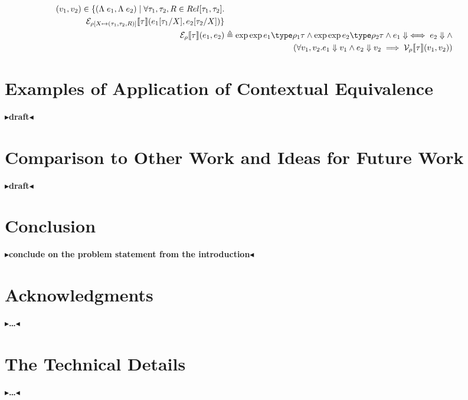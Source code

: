 \documentclass[twoside,11pt,openright]{report}
\theoremstyle{definition}
\newcommand{\expr}{e}
\newcommand{\val}{v}
\newcommand{\Tvar}{X}
\newcommand{\Tlam}{\Lambda\;}
\newcommand{\subst}[3]{#1{\left[#3 \middle/ #2 \right]}}
\newcommand{\typ}{\tau}
\newcommand{\empvenv}{\bullet}
\newcommand{\emptenv}{\bullet}
\def\envs#1#2\exp#3\type#4{#1 \; | \; #2 \; \vdash #3 : #4}
\newcommand{\ValInp}[2]{\mathcal{V}_{#1} \llbracket #2 \rrbracket}
\newcommand{\ValInpGen}[2]{\ValInp{#1}{#2}(\val_1, \val_2)}
\newcommand{\ExpInp}[2]{\mathcal{E}_{#1} \llbracket #2 \rrbracket}
\newcommand{\map}[2]{#1 \mapsto #2}
\newcommand{\todo}[1]{{\color[rgb]{.5,0,0}\textbf{$\blacktriangleright$#1$\blacktriangleleft$}}}
\begin{document}
\begin{align*}
\begin{aligned}[t]
    (\val_1, \val_2) \in \{(\Tlam \expr_1, \Tlam \expr_2) \mid \forall \typ_1, \typ_2, R \in Rel[\typ_1, \typ_2] .\\
    \ExpInp{\rho[\map{\Tvar}{(\typ_1, \typ_2, R)}]}{\typ}(\subst{\expr_1}{\Tvar}{\typ_1}, \subst{\expr_2}{\Tvar}{\typ_2})\}
  \end{aligned}\\
  \ExpInp{\rho}{\typ}(\expr_1, \expr_2) &\triangleq 
  \begin{aligned}[t]
    \envs \emptenv \empvenv \exp \expr_1 \type \rho_1{\typ} \land \envs \emptenv \empvenv \exp \expr_2 \type \rho_2{\typ} \land \expr_1 \Downarrow \iff \expr_2 \Downarrow \land\\
    (\forall \val_1, \val_2 . \expr_1 \Downarrow \val_1 \land \expr_2 \Downarrow \val_2 \implies \ValInpGen{\rho}{\typ})
  \end{aligned}
\end{align*}



\chapter{Examples of Application of Contextual Equivalence}
\label{ch:ACE}

\todo{draft}


\chapter{Comparison to Other Work and Ideas for Future Work}
\label{ch:COWFW}

\todo{draft}


\chapter{Conclusion}
\label{ch:conclusion}

\todo{conclude on the problem statement from the introduction}

\chapter*{Acknowledgments}

\todo{\dots}


\cleardoublepage
{}
 



\cleardoublepage
\appendix
\chapter{The Technical Details}

\todo{\dots}
\end{document}
